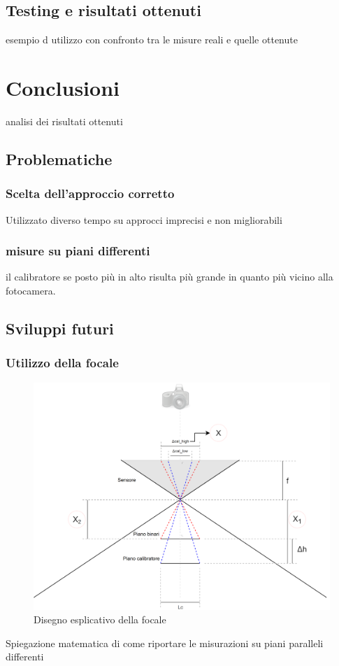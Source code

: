 \documentclass[twoside]{supsistudent}
\begin{document}
\section{Testing e risultati ottenuti}
esempio d utilizzo con confronto tra le misure reali e quelle ottenute

\chapter{Conclusioni}
analisi dei risultati ottenuti 

\section{Problematiche}
\subsection{Scelta dell'approccio corretto}
Utilizzato diverso tempo su approcci imprecisi e non migliorabili
\subsection{misure su piani differenti}
il calibratore se posto più in alto risulta più grande in quanto più vicino alla fotocamera.
\section{Sviluppi futuri}
\subsection{Utilizzo della focale}
\begin{figure}[H]
  \center
  \includegraphics[scale=0.45]{images/ProblemaAltezza.png}
  \caption{Disegno esplicativo della focale}
\end{figure}
Spiegazione matematica di come riportare le misurazioni su piani paralleli differenti
\end{document}

